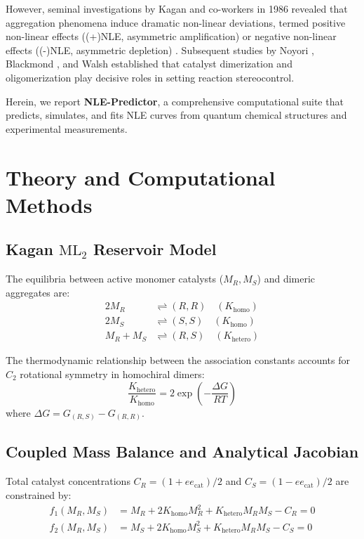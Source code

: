 \documentclass[11pt,a4paper]{article}
\begin{document}
However, seminal investigations by Kagan and co-workers in 1986 revealed that aggregation phenomena induce dramatic non-linear deviations, termed positive non-linear effects ((+)NLE, asymmetric amplification) or negative non-linear effects ((-)NLE, asymmetric depletion) \cite{Kagan1986,Kagan1989,Kagan2003}. Subsequent studies by Noyori \cite{Noyori1989}, Blackmond \cite{Blackmond2000,Blackmond2004}, and Walsh \cite{Walsh2003} established that catalyst dimerization and oligomerization play decisive roles in setting reaction stereocontrol.

Herein, we report \textbf{NLE-Predictor}, a comprehensive computational suite that predicts, simulates, and fits NLE curves from quantum chemical structures and experimental measurements.

\section{Theory and Computational Methods}

\subsection{Kagan $\text{ML}_2$ Reservoir Model}
The equilibria between active monomer catalysts ($M_R, M_S$) and dimeric aggregates are:
\begin{align}
2 M_R &\rightleftharpoons (R,R) \quad (K_{\text{homo}}) \\
2 M_S &\rightleftharpoons (S,S) \quad (K_{\text{homo}}) \\
M_R + M_S &\rightleftharpoons (R,S) \quad (K_{\text{hetero}})
\end{align}

The thermodynamic relationship between the association constants accounts for $C_2$ rotational symmetry in homochiral dimers:
\begin{equation}
\frac{K_{\text{hetero}}}{K_{\text{homo}}} = 2 \exp\left(-\frac{\Delta G}{RT}\right)
\end{equation}
where $\Delta G = G_{(R,S)} - G_{(R,R)}$.

\subsection{Coupled Mass Balance and Analytical Jacobian}
Total catalyst concentrations $C_R = (1 + ee_{\text{cat}})/2$ and $C_S = (1 - ee_{\text{cat}})/2$ are constrained by:
\begin{align}
f_1(M_R, M_S) &= M_R + 2 K_{\text{homo}} M_R^2 + K_{\text{hetero}} M_R M_S - C_R = 0 \\
f_2(M_R, M_S) &= M_S + 2 K_{\text{homo}} M_S^2 + K_{\text{hetero}} M_R M_S - C_S = 0
\end{align}
\end{document}

